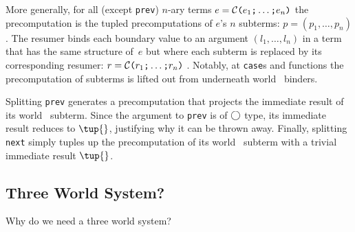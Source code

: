 \begin{abstrsyn}
More generally, for all (except \texttt{prev}) 
$n$-ary terms $e = \mathcal{C}\texttt{(} e_1 \texttt{;} \ldots \texttt{;} e_n \texttt{)}$ 
the precomputation is the tupled precomputations of $e$'s $n$ subterms:
$p=(p_1,\ldots,p_n)$.  The resumer binds each boundary value to an
argument $(l_1,\ldots,l_n)$ in a term that has the same structure
of~$e$ but where each subterm is replaced by its corresponding resumer:
$r = \mathcal{C}\texttt{(} r_1 \texttt{;} \ldots \texttt{;} r_n \texttt{)}$ .
Notably, at \texttt{case}s and functions the
precomputation of subterms is lifted out from underneath world \bbtwo\ binders.  

Splitting \texttt{prev} generates a precomputation that projects the immediate
result of its world \bbone\ subterm.
Since the argument to \texttt{prev} is of $\bigcirc$ type, its immediate result reduces to $\tup{}$, justifying why it can be thrown away.
Finally, splitting \texttt{next} simply tuples up the precomputation of its
world \bbtwo\ subterm with a trivial immediate result $\tup{}$.

\subsection {Three World System?}

Why do we need a three world system?

\end{abstrsyn}



